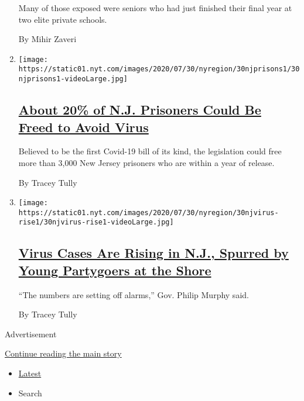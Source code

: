 \begin{enumerate}
  Many of those exposed were seniors who had just finished their final
  year at two elite private schools.

  By Mihir Zaveri
\item
  \texttt{[image: https://static01.nyt.com/images/2020/07/30/nyregion/30njprisons1/30njprisons1-videoLarge.jpg]}

  \hypertarget{about-20-of-nj-prisoners-could-be-freed-to-avoid-virus}{%
  \subsection{\texorpdfstring{\href{/2020/07/30/nyregion/New-jersey-inmate-release-Covid.html}{About
  20\% of N.J. Prisoners Could Be Freed to Avoid
  Virus}}{About 20\% of N.J. Prisoners Could Be Freed to Avoid Virus}}\label{about-20-of-nj-prisoners-could-be-freed-to-avoid-virus}}

  Believed to be the first Covid-19 bill of its kind, the legislation
  could free more than 3,000 New Jersey prisoners who are within a year
  of release.

  By Tracey Tully
\item
  \texttt{[image: https://static01.nyt.com/images/2020/07/30/nyregion/30njvirus-rise1/30njvirus-rise1-videoLarge.jpg]}

  \hypertarget{virus-cases-are-rising-in-nj-spurred-by-young-partygoers-at-the-shore}{%
  \subsection{\texorpdfstring{\href{/2020/07/30/nyregion/coronavirus-cases-nj.html}{Virus
  Cases Are Rising in N.J., Spurred by Young Partygoers at the
  Shore}}{Virus Cases Are Rising in N.J., Spurred by Young Partygoers at the Shore}}\label{virus-cases-are-rising-in-nj-spurred-by-young-partygoers-at-the-shore}}

  ``The numbers are setting off alarms,'' Gov. Philip Murphy said.

  By Tracey Tully
\end{enumerate}

Advertisement

\protect\hyperlink{after-mid1}{Continue reading the main story}

\begin{itemize}
\tightlist
\item
  \protect\hyperlink{stream-panel}{Latest}
\item
  Search
\end{itemize}

